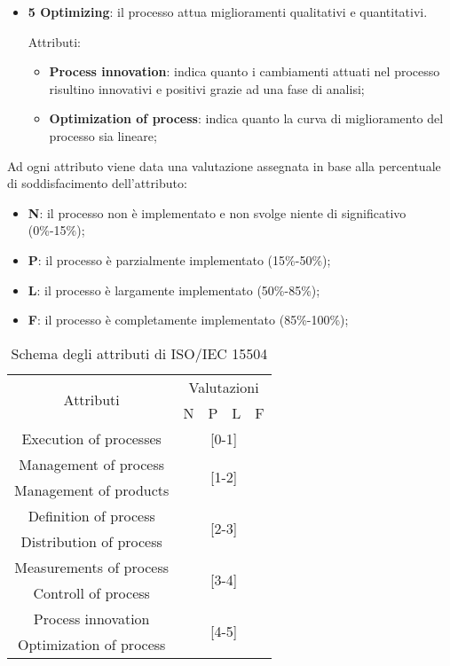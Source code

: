 \begin{itemize}
	\item \textbf{5 Optimizing}: il processo attua miglioramenti qualitativi e quantitativi.
	
	Attributi:
	
	\begin{itemize}
		\item \textbf{Process innovation}: indica quanto i cambiamenti attuati nel processo risultino innovativi e positivi grazie ad una fase di analisi;
		\item \textbf{Optimization of process}: indica quanto la curva di miglioramento del processo sia lineare;
	\end{itemize}
\end{itemize}

Ad ogni attributo viene data una valutazione assegnata in base alla percentuale di soddisfacimento dell'attributo:

\begin{itemize}
	\item \textbf{N}: il processo non è implementato e non svolge niente di significativo (0\%-15\%);
	\item \textbf{P}: il processo è parzialmente implementato (15\%-50\%);
	\item \textbf{L}: il processo è largamente implementato (50\%-85\%);
	\item \textbf{F}: il processo è completamente implementato (85\%-100\%); 
\end{itemize}

\begin{table}[h]
\centering
\begin{tabular}{ccccc}
	
	\toprule
	\multirow{2}{*}{Attributi} & \multicolumn{4}{c}{Valutazioni}\\
	\cmidrule(lr){2-5} & N & P & L & F\\
	\midrule Execution of processes & \multicolumn{4}{c}{[0-1]}\\
	\midrule Management of process & \multicolumn{4}{c}{\multirow{2}{*}{[1-2]}}\\
	Management of products\\
	\midrule Definition of process & \multicolumn{4}{c}{\multirow{2}{*}{[2-3]}}\\
	Distribution of process\\
	\midrule Measurements of process & \multicolumn{4}{c}{\multirow{2}{*}{[3-4]}}\\
	Controll of process\\
	\midrule Process innovation & \multicolumn{4}{c}{\multirow{2}{*}{[4-5]}}\\
	Optimization of process\\
	\bottomrule
	
	
	
\end{tabular}
\label{tab:spice}
\caption{Schema degli attributi di ISO/IEC 15504}
\end{table}